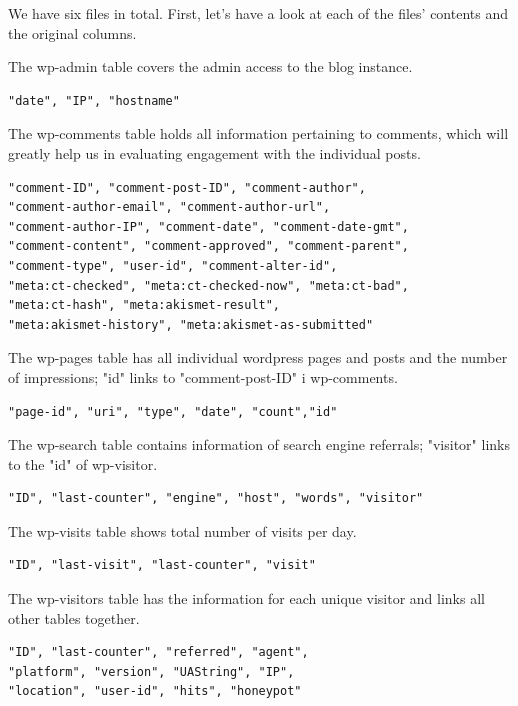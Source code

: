 We have six files in total. First, let's have a look at each of the files' contents and the original columns.

The wp-admin table covers the admin access to the blog instance.
\begin{lstlisting}[caption=wp-admin, frame=single, basicstyle=\ttfamily]
"date", "IP", "hostname"
\end{lstlisting}

The wp-comments table holds all information pertaining to comments, which will greatly help us in evaluating engagement with the individual posts.
\begin{lstlisting}[caption=wp-comments, frame=single, basicstyle=\ttfamily]
"comment-ID", "comment-post-ID", "comment-author", 
"comment-author-email", "comment-author-url", 
"comment-author-IP", "comment-date", "comment-date-gmt", 
"comment-content", "comment-approved", "comment-parent", 
"comment-type", "user-id", "comment-alter-id", 
"meta:ct-checked", "meta:ct-checked-now", "meta:ct-bad", 
"meta:ct-hash", "meta:akismet-result", 
"meta:akismet-history", "meta:akismet-as-submitted"
\end{lstlisting}

The wp-pages table has all individual wordpress pages and posts and the number of impressions; "id" links to "comment-post-ID" i wp-comments.
\begin{lstlisting}[caption=wp-pages, frame=single, basicstyle=\ttfamily]
"page-id", "uri", "type", "date", "count","id"
\end{lstlisting}

The wp-search table contains information of search engine referrals; "visitor" links to the "id" of wp-visitor.
\begin{lstlisting}[caption=wp-search, frame=single, basicstyle=\ttfamily]
"ID", "last-counter", "engine", "host", "words", "visitor"
\end{lstlisting}

The wp-visits table shows total number of visits per day.
\begin{lstlisting}[caption=wp-visit, frame=single, basicstyle=\ttfamily]
"ID", "last-visit", "last-counter", "visit"
\end{lstlisting}

The wp-visitors table has the information for each unique visitor and links all other tables together.
\begin{lstlisting}[caption=wp-visitor, frame=single, basicstyle=\ttfamily]
"ID", "last-counter", "referred", "agent", 
"platform", "version", "UAString", "IP", 
"location", "user-id", "hits", "honeypot"
\end{lstlisting}

